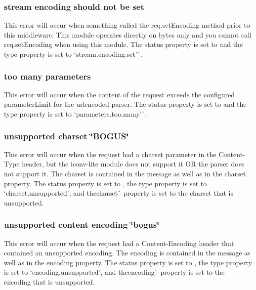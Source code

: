 \subsubsection*{stream encoding should not be set}

This error will occur when something called the {\ttfamily req.\+set\+Encoding} method prior to this middleware. This module operates directly on bytes only and you cannot call {\ttfamily req.\+set\+Encoding} when using this module. The {\ttfamily status} property is set to {} and the {\ttfamily type} property is set to `\textquotesingle{}stream.\+encoding.\+set'\`{}.

\subsubsection*{too many parameters}

This error will occur when the content of the request exceeds the configured {\ttfamily parameter\+Limit} for the {\ttfamily urlencoded} parser. The {\ttfamily status} property is set to {} and the {\ttfamily type} property is set to `\textquotesingle{}parameters.\+too.\+many'\`{}.

\subsubsection*{unsupported charset \char`\"{}\+B\+O\+G\+U\+S\char`\"{}}

This error will occur when the request had a charset parameter in the {\ttfamily Content-\/\+Type} header, but the {\ttfamily iconv-\/lite} module does not support it OR the parser does not support it. The charset is contained in the message as well as in the {\ttfamily charset} property. The {\ttfamily status} property is set to {}, the {\ttfamily type} property is set to `\textquotesingle{}charset.\+unsupported'{\ttfamily , and the}charset\`{} property is set to the charset that is unsupported.

\subsubsection*{unsupported content encoding \char`\"{}bogus\char`\"{}}

This error will occur when the request had a {\ttfamily Content-\/\+Encoding} header that contained an unsupported encoding. The encoding is contained in the message as well as in the {\ttfamily encoding} property. The {\ttfamily status} property is set to {}, the {\ttfamily type} property is set to `\textquotesingle{}encoding.\+unsupported'{\ttfamily , and the}encoding\`{} property is set to the encoding that is unsupported.

